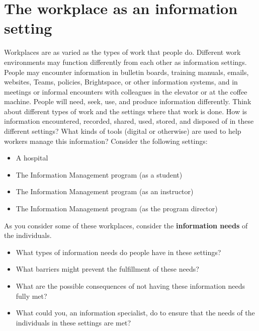 \documentclass[
  letterpaper,
  DIV=11,
  numbers=noendperiod]{scrreprt}
\providecommand{\tightlist}{%
  \setlength{\itemsep}{0pt}\setlength{\parskip}{0pt}}
\begin{document}
\section{The workplace as an information
setting}\label{the-workplace-as-an-information-setting}

Workplaces are as varied as the types of work that people do. Different
work environments may function differently from each other as
information settings. People may encounter information in bulletin
boards, training manuals, emails, websites, Teams, policies,
Brightspace, or other information systems, and in meetings or informal
encounters with colleagues in the elevator or at the coffee machine.
People will need, seek, use, and produce information differently. Think
about different types of work and the settings where that work is done.
How is information encountered, recorded, shared, used, stored, and
disposed of in these different settings? What kinds of tools (digital or
otherwise) are used to help workers manage this information? Consider
the following settings:

\begin{itemize}
\item
  A hospital
\item
  The Information Management program (as a student)
\item
  The Information Management program (as an instructor)
\item
  The Information Management program (as the program director)
\end{itemize}

\begin{tcolorbox}[enhanced jigsaw, arc=.35mm, bottomrule=.15mm, bottomtitle=1mm, breakable, colback=white, colbacktitle=quarto-callout-tip-color!10!white, colframe=quarto-callout-tip-color-frame, coltitle=black, left=2mm, leftrule=.75mm, opacityback=0, opacitybacktitle=0.6, rightrule=.15mm, title=\textcolor{quarto-callout-tip-color}{\faLightbulb}\hspace{0.5em}{Pause and reflect}, titlerule=0mm, toprule=.15mm, toptitle=1mm]

As you consider some of these workplaces, consider the
\textbf{information needs} of the individuals.

\begin{itemize}
\tightlist
\item
  What types of information needs do people have in these settings?
\item
  What barriers might prevent the fulfillment of these needs?
\item
  What are the possible consequences of not having these information
  needs fully met?
\item
  What could you, an information specialist, do to ensure that the needs
  of the individuals in these settings are met?
\end{itemize}

\end{tcolorbox}
\end{document}
